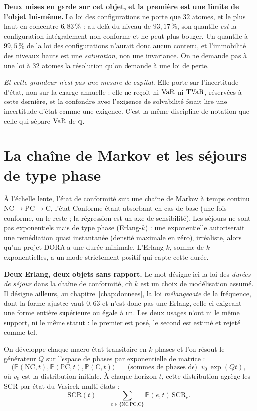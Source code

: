 \begin{attention}
\textbf{Deux mises en garde sur cet objet, et la première est une limite de l'objet lui-même.}
La loi des configurations ne porte que $32$ atomes, et le plus haut en concentre $6{,}83\,\%$ :
au-delà du niveau de $93{,}17\,\%$, son quantile \emph{est} la configuration intégralement non
conforme et ne peut plus bouger. Un \og{}quantile à $99{,}5\,\%$ de la loi des
configurations\fg{} n'aurait donc aucun contenu, et l'immobilité des niveaux hauts est une
\emph{saturation}, non une invariance. On ne demande pas à une loi à $32$ atomes la résolution
qu'on demande à une loi de perte.

\emph{Et cette grandeur n'est pas une mesure de capital.} Elle porte sur l'incertitude d'état,
non sur la charge annuelle : elle ne reçoit ni $\mathrm{VaR}$ ni $\mathrm{TVaR}$, réservées à cette dernière, et
la confondre avec l'exigence de solvabilité ferait lire une incertitude d'état comme une
exigence. C'est la même discipline de notation que celle qui sépare $\mathrm{VaR}$ de $\mathrm{q}$.
\end{attention}

\section{La chaîne de Markov et les séjours de type phase}

À l'échelle lente, l'état de conformité suit une chaîne de Markov à temps continu
$\text{NC}\to\text{PC}\to\text{C}$, l'état Conforme étant absorbant en cas de base
(une fois conforme, on le reste ; la régression est un axe de sensibilité). Les séjours ne sont
pas exponentiels mais de type phase (Erlang-$k$) : une exponentielle autoriserait une
remédiation quasi instantanée (densité maximale en zéro), irréaliste, alors qu'un projet DORA a
une durée minimale. L'Erlang-$k$, somme de $k$ exponentielles, a un mode strictement positif qui
capte cette durée.

\begin{attention}
\textbf{Deux Erlang, deux objets sans rapport.} Le mot désigne ici la loi des \emph{durées de
séjour} dans la chaîne de conformité, où $k$ est un choix de modélisation assumé. Il désigne
ailleurs, au chapitre~\ref{chap:donnees}, la loi \emph{mélangeante} de la fréquence, dont la
forme ajustée vaut $0{,}63$ et n'est donc pas une Erlang, celle-ci exigeant une forme
entière supérieure ou égale à un. Les deux usages n'ont ni le même support, ni le même statut :
le premier est posé, le second est estimé et rejeté comme tel.
\end{attention} On développe chaque macro-état transitoire en $k$ phases et l'on résout le
générateur $Q$ sur l'espace de phases par exponentielle de matrice :
\begin{equation}
\big(\mathbb P(\text{NC},t),\mathbb P(\text{PC},t),\mathbb P(\text{C},t)\big)
\;=\; \text{(sommes de phases de)}\;\; v_0\,\exp(Qt),
\end{equation}
où $v_0$ est la distribution initiale. À chaque horizon $t$, cette distribution agrège les SCR
par état du Vasicek multi-états :
\begin{equation}
\mathrm{SCR}(t)\;=\;\sum_{e\in\{\text{NC,PC,C}\}}\mathbb P(e,t)\,\mathrm{SCR}_e .
\end{equation}

